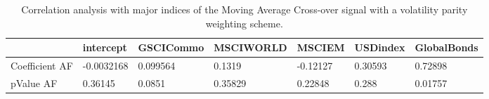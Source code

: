 \begin{table}[H]
\centering
\begin{tabular}{lllllll}
& intercept & GSCICommo & MSCIWORLD & MSCIEM & USDindex & GlobalBonds \\ 
\hline 
Coefficient AF & -0.0032168 & 0.099564 & 0.1319 & -0.12127 & 0.30593 & 0.72898 \\ 
pValue AF & 0.36145 & 0.0851 & 0.35829 & 0.22848 & 0.288 & 0.01757 \\ 
\hline
\end{tabular}
\caption{Correlation analysis with major indices of the Moving Average Cross-over signal with a volatility parity weighting scheme.}
\label{MAVP_AFACTOR}
\end{table}